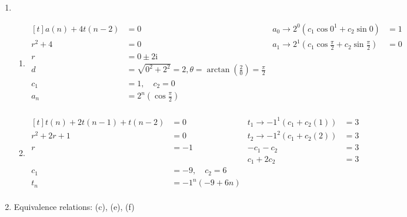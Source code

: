 \begin{enumerate}[leftmargin=2cm,labelsep=.5cm,label=\bf\arabic*.]
\item
\begin{enumerate}
\item $
\begin{aligned}[t]
a(n) + 4t(n-2) &= 0                & a_0 \rightarrow 2^0(c_1\cos{0}^1 + c_2\sin{0}) &= 1 \\
r^2 + 4 &= 0                       & a_1 \rightarrow 2^1(c_1\cos{\frac{\pi}{2}} + c_2\sin{\frac{\pi}{2}}) &= 0 \\
r &= 0 \pm 2\mathrm{i}             & & \\
d &= \sqrt{0^2 + 2^2} = 2, \theta = \arctan\left(\frac{2}{0}\right) = \frac{\pi}{2} & &\\[2mm]
c_1 &= 1, \quad c_2 = 0 & & \\
a_n &= 2^n(\cos{\frac{\pi}{2}})\\[1cm]
\end{aligned} $

\item $
\begin{aligned}[t]
t(n) + 2t(n-1) + t(n-2) &= 0  & t_1 \rightarrow -1^1(c_1 + c_2(1)) &= 3 \\
r^2 + 2r + 1 &= 0             & t_2 \rightarrow -1^2(c_1 + c_2(2)) &= 3 \\
r &= -1                       & -c_1 - c_2 &= 3 \\
&                             & c_1 + 2c_2 &= 3 \\[2mm]
c_1 &= -9, \quad c_2 = 6  & & \\
t_n &= -1^n(-9 + 6n) \\[1cm]
\end{aligned} $


\end{enumerate}

\item Equivalence relations: (c), (e), (f)\\[5mm]

\end{enumerate}
